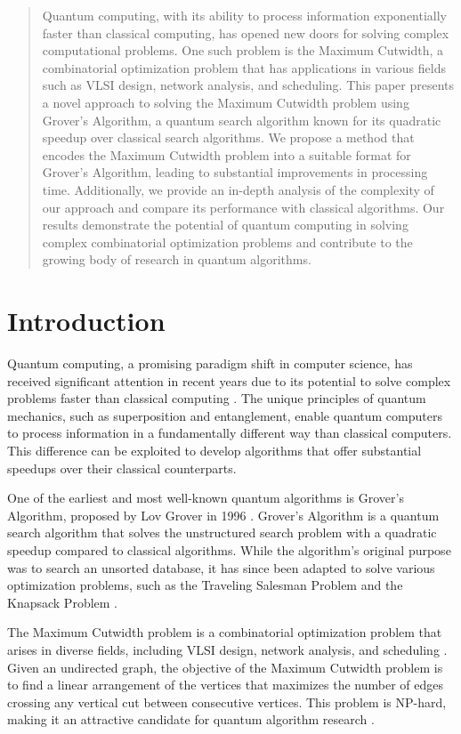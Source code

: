 \begin{abstract}
Quantum computing, with its ability to process information exponentially faster than classical computing, has opened new doors for solving complex computational problems. One such problem is the Maximum Cutwidth, a combinatorial optimization problem that has applications in various fields such as VLSI design, network analysis, and scheduling. This paper presents a novel approach to solving the Maximum Cutwidth problem using Grover's Algorithm, a quantum search algorithm known for its quadratic speedup over classical search algorithms. We propose a method that encodes the Maximum Cutwidth problem into a suitable format for Grover's Algorithm, leading to substantial improvements in processing time. Additionally, we provide an in-depth analysis of the complexity of our approach and compare its performance with classical algorithms. Our results demonstrate the potential of quantum computing in solving complex combinatorial optimization problems and contribute to the growing body of research in quantum algorithms.
\end{abstract}

\section{Introduction}

Quantum computing, a promising paradigm shift in computer science, has received significant attention in recent years due to its potential to solve complex problems faster than classical computing \cite{nielsen_chuang_2010}. The unique principles of quantum mechanics, such as superposition and entanglement, enable quantum computers to process information in a fundamentally different way than classical computers. This difference can be exploited to develop algorithms that offer substantial speedups over their classical counterparts.

One of the earliest and most well-known quantum algorithms is Grover's Algorithm, proposed by Lov Grover in 1996 \cite{grover1996fast}. Grover's Algorithm is a quantum search algorithm that solves the unstructured search problem with a quadratic speedup compared to classical algorithms. While the algorithm's original purpose was to search an unsorted database, it has since been adapted to solve various optimization problems, such as the Traveling Salesman Problem and the Knapsack Problem \cite{zalka1999grover, montanaro2015quantum}.

The Maximum Cutwidth problem is a combinatorial optimization problem that arises in diverse fields, including VLSI design, network analysis, and scheduling \cite{garey_johnson_1979, monien1988maximum}. Given an undirected graph, the objective of the Maximum Cutwidth problem is to find a linear arrangement of the vertices that maximizes the number of edges crossing any vertical cut between consecutive vertices. This problem is NP-hard, making it an attractive candidate for quantum algorithm research \cite{karp1972reducibility}.

